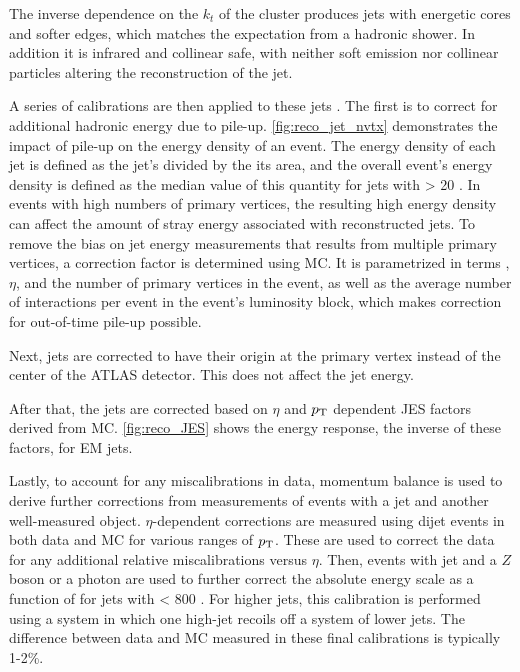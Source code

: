 The inverse dependence on the $k_t$ of the cluster produces jets with energetic cores and softer edges, which matches the expectation from a hadronic shower. In addition it is infrared and collinear safe, with neither soft emission nor collinear particles altering the reconstruction of the jet.

A series of calibrations are then applied to these jets \cite{PERF-2012-01}. The first is to correct for additional hadronic energy due to pile-up. \autoref{fig:reco_jet_nvtx} demonstrates the impact of pile-up on the energy density of an event. The energy density of each jet is defined as the jet's \pt divided by the its area, and the overall event's energy density is defined as the median value of this quantity for jets with \pt > 20 \gev. In events with high numbers of primary vertices, the resulting high energy density can affect the amount of stray energy associated with reconstructed jets. To remove the bias on jet energy measurements that results from multiple primary vertices, a correction factor is determined using \ac{MC}. It is parametrized in terms \pt, $\eta$, and the number of primary vertices in the event, as well as the average number of interactions per event in the event's luminosity block, which makes correction for out-of-time pile-up possible. 

Next, jets are corrected to have their origin at the primary vertex instead of the center of the \ac{ATLAS} detector. This does not affect the jet energy.

After that, the jets are corrected based on $\eta$ and $p_{\text{T}}$ dependent \acf{JES} factors derived from \ac{MC}. \autoref{fig:reco_JES} shows the energy response, the inverse of these factors, for \ac{EM} jets. 

Lastly, to account for any miscalibrations in data, momentum balance is used to derive further corrections from measurements of events with a jet and another well-measured object. $\eta$-dependent corrections are measured using dijet events in both data and \ac{MC} for various ranges of $p_{\text{T}}$. These are used to correct the data for any additional relative miscalibrations versus $\eta$. Then, events with jet and a $Z$ boson or a photon are used to further correct the absolute energy scale as a function of \pt for jets with \pt < 800 \gev. For higher \pt jets, this calibration is performed using a system in which one high-\pt jet recoils off a system of lower \pt jets. The difference between data and \ac{MC} measured in these final calibrations is typically 1-2\%.

